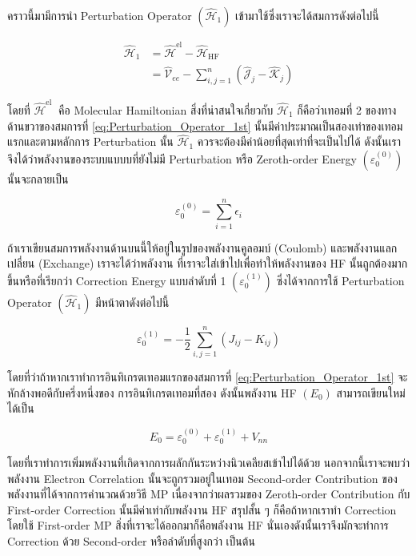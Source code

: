 คราวนี้มามีการนำ Perturbation Operator $(\hat{\mathscr{H}}_1)$ เข้ามาใช้ซึ่งเราจะได้สมการดังต่อไปนี้

\begin{equation}
    \label{eq:Perturbation_Operator_1st}
    \begin{aligned}
        \hat{\mathscr{H}}_1
         & = \hat{\mathscr{H}}^{\mathrm{el}} - \hat{\mathscr{H}}_{\mathrm{HF}} \\
         & = \hat{\mathscr{V}}_{e e} - \sum_{i, j=1}^n
        \left(
        \hat{\mathscr{J}}_j - \hat{\mathscr{K}}_j
        \right)
    \end{aligned}
\end{equation}

\noindent โดยที่ $\hat{\mathscr{H}}^{\text{el }}$ คือ Molecular Hamiltonian สิ่งที่น่าสนใจเกี่ยวกับ $\hat{\mathscr{H}}_1$
ก็คือว่าเทอมที่ 2 ของทางด้านขวาของสมการที่ \eqref{eq:Perturbation_Operator_1st} นั้นมีค่าประมาณเป็นสองเท่าของเทอมแรกและตามหลักการ
Perturbation นั้น $\hat{\mathscr{H}}_1$ ควรจะต้องมีค่าน้อยที่สุดเท่าที่จะเป็นไปได้ ดังนั้นเราจึงได้ว่าพลังงานของระบบแบบบที่ยังไม่มี
Perturbation หรือ Zeroth-order Energy $(\varepsilon_{0}^{(0)})$ นั้นจะกลายเป็น

\begin{equation}
    \varepsilon_{0}^{(0)} = \sum_{i=1}^{n} \epsilon_{i}
\end{equation}

\noindent ถ้าเราเขียนสมการพลังงานด้านบนนี้ให้อยู่ในรูปของพลังงานคูลอมบ์ (Coulomb) และพลังงานแลกเปลี่ยน (Exchange) เราจะได้ว่าพลังงาน%
ที่เราจะใส่เข้าไปเพื่อทำให้พลังงานของ HF นั้นถูกต้องมากขึ้นหรือที่เรียกว่า Correction Energy แบบลำดับที่ 1 $(\varepsilon_{0}^{(1)})$
ซึ่งได้จากการใช้ Perturbation Operator $(\hat{\mathscr{H}}_1)$ มีหน้าตาดังต่อไปนี้

\begin{equation}
    \varepsilon_{0}^{(1)}
    =
    - \frac{1}{2} \sum_{i, j=1}^{n}
    \left(
    J_{i j}-K_{i j}
    \right)
\end{equation}

\noindent โดยที่ว่าถ้าหากเราทำการอินทิเกรตเทอมแรกของสมการที่ \eqref{eq:Perturbation_Operator_1st} จะหักล้างพอดีกับครึ่งหนึ่งของ%
การอินทิเกรตเทอมที่สอง ดังนั้นพลังงาน HF $(E_{0})$ สามารถเขียนใหม่ได้เป็น

\begin{equation}
    E_{0}
    =
    \varepsilon_{0}^{(0)}+\varepsilon_{0}^{(1)}+V_{n n}
\end{equation}

\noindent โดยที่เราทำการเพิ่มพลังงานที่เกิดจากการผลักกันระหว่างนิวเคลียสเข้าไปได้ด้วย นอกจากนี้เราจะพบว่าพลังงาน Electron Correlation
นั้นจะถูกรวมอยู่ในเทอม Second-order Contribution ของพลังงานที่ได้จากการคำนวณด้วยวิธี MP เนื่องจากว่าผลรวมของ Zeroth-order
Contribution กับ First-order Correction นั้นมีค่าเท่ากับพลังงาน HF สรุปสั้น ๆ ก็คือถ้าหากเราทำ Correction โดยใช้ First-order
MP สิ่งที่เราจะได้ออกมาก็คือพลังงาน HF นั่นเองดังนั้นเราจึงมักจะทำการ Correction ด้วย Second-order หรือลำดับที่สูงกว่า เป็นต้น

